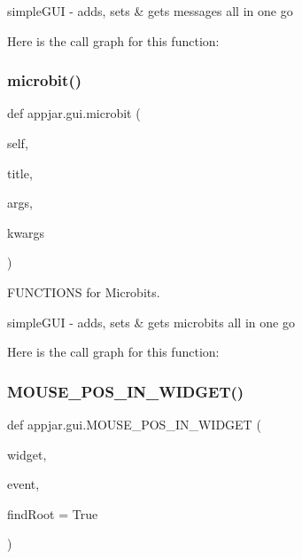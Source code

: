\begin{DoxyVerb}
\begin{DoxyVerb}simpleGUI - adds, sets & gets messages all in one go \end{DoxyVerb}
 Here is the call graph for this function\+:
\mbox{\label{classappjar_1_1gui_a3ce620c25bd33f4bc98a3b199f32136b}} 
\subsubsection{\texorpdfstring{microbit()}{microbit()}}
{\footnotesize\ttfamily def appjar.\+gui.\+microbit (\begin{DoxyParamCaption}\item[{}]{self,  }\item[{}]{title,  }\item[{}]{args,  }\item[{}]{kwargs }\end{DoxyParamCaption})}



F\+U\+N\+C\+T\+I\+O\+NS for Microbits. 

\begin{DoxyVerb}simpleGUI - adds, sets & gets microbits all in one go\end{DoxyVerb}
 Here is the call graph for this function\+:
\mbox{\label{classappjar_1_1gui_a78f91618f79934dce10c51c83d18d9b7}} 
\subsubsection{\texorpdfstring{M\+O\+U\+S\+E\+\_\+\+P\+O\+S\+\_\+\+I\+N\+\_\+\+W\+I\+D\+G\+E\+T()}{MOUSE\_POS\_IN\_WIDGET()}}
{\footnotesize\ttfamily def appjar.\+gui.\+M\+O\+U\+S\+E\+\_\+\+P\+O\+S\+\_\+\+I\+N\+\_\+\+W\+I\+D\+G\+ET (\begin{DoxyParamCaption}\item[{}]{widget,  }\item[{}]{event,  }\item[{}]{find\+Root = {\ttfamily True} }\end{DoxyParamCaption})\hspace{0.3cm}{\ttfamily [static]}}


\end{DoxyVerb}
